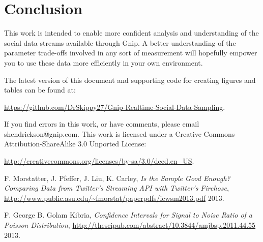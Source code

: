 \documentclass{article}
\begin{document}
\section{Conclusion} 

This work is intended to enable more confident analysis and understanding of the social data 
streams available through Gnip. A better understanding of the parameter trade-offs involved 
in any sort of measurement will hopefully empower you to use these data more efficiently in 
your own environment.

The latest version of this document and supporting code for creating figures and tables 
can be found at:

\noindent \url{https://github.com/DrSkippy27/Gnip-Realtime-Social-Data-Sampling}.

If you find errors in this work, or have comments, please email shendrickson@gnip.com. This 
work is licensed under a Creative Commons Attribution-ShareAlike 3.0 Unported License:

\noindent \url{http://creativecommons.org/licenses/by-sa/3.0/deed.en_US}.


\begin{thebibliography}{2013}



 F. Morstatter, J. Pfeffer, J. Liu, K. Carley, \textsl{Is the Sample Good Enough? Comparing Data from Twitter’s Streaming API with Twitter’s Firehose}, \url{http://www.public.asu.edu/~fmorstat/paperpdfs/icwsm2013.pdf} 2013.

 F. George B. Golam Kibria, \textsl{Confidence Intervals for Signal to Noise Ratio of
a Poisson Distribution}, \url{http://thescipub.com/abstract/10.3844/amjbsp.2011.44.55} 2013.

\end{thebibliography}
\end{document}
